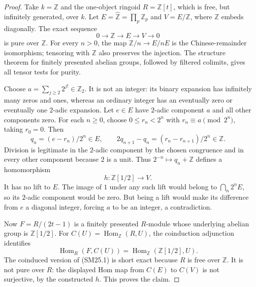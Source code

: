 \begin{proof}
Take $k=\mathbb Z$ and the one-object ringoid $R=\mathbb Z[t]$,
which is free, but infinitely generated, over $k$.
Let
$E=\widehat{\mathbb Z}=\prod_p\mathbb Z_p$ and $V=E/\mathbb Z$,
where $\mathbb Z$ embeds diagonally.
The exact sequence
\[
 0\longrightarrow\mathbb Z\longrightarrow E
       \longrightarrow V\longrightarrow0
 \tag{SM25.1}
\]
is pure over $\mathbb Z$. For every $n>0$, the map
$\mathbb Z/n\to E/nE$ is the Chinese-remainder isomorphism;
tensoring with $\mathbb Z$ also preserves the injection.
The structure theorem for finitely presented abelian groups,
followed by filtered colimits, gives all tensor tests for purity.

Choose $a=\sum_{j\geq2}2^{j!}\in\mathbb Z_2$.
It is not an integer: its binary expansion has infinitely many
zeros and ones, whereas an ordinary integer has an eventually
zero or eventually one $2$-adic expansion.
Let $e\in E$ have $2$-adic component $a$ and all other components
zero. For each $n\geq0$, choose
$0\leq r_n<2^n$ with $r_n\equiv a\pmod{2^n}$, taking $r_0=0$.
Then
\[
 q_n=(e-r_n)/2^n\in E,\qquad
 2q_{n+1}-q_n=(r_n-r_{n+1})/2^n\in\mathbb Z.
\]
Division is legitimate in the $2$-adic component by the chosen
congruence and in every other component because $2$ is a unit.
Thus $2^{-n}\mapsto q_n+\mathbb Z$ defines a homomorphism
\[
 h:\mathbb Z[1/2]\longrightarrow V.
\]
It has no lift to $E$. The image of $1$ under any such lift would
belong to $\bigcap_n2^n E$, so its $2$-adic component would be
zero. But being a lift would make its difference from $e$ a
diagonal integer, forcing $a$ to be an integer, a contradiction.

Now $F=R/(2t-1)$ is a finitely presented $R$-module whose
underlying abelian group is $\mathbb Z[1/2]$.
For $C(U)=\operatorname{Hom}_{\mathbb Z}(R,U)$, the coinduction
adjunction identifies
\[
 \operatorname{Hom}_R(F,C(U))
       =\operatorname{Hom}_{\mathbb Z}(\mathbb Z[1/2],U).
\]
The coinduced version of (SM25.1) is short exact because
$R$ is free over $\mathbb Z$. It is not pure over $R$:
the displayed Hom map from $C(E)$ to $C(V)$ is not surjective,
by the constructed $h$. This proves the claim.
\end{proof}

